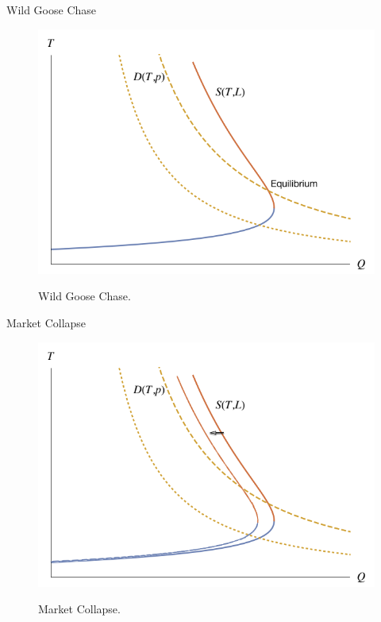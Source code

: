     \begin{frame}{Wild Goose Chase}
        \begin{figure}
            \centering
            {\includegraphics[scale=0.30]{plots/wild_goose_chase_1.png}}
            \caption{Wild Goose Chase.}
        \end{figure}
    \end{frame}


    \begin{frame}{Market Collapse}
        \begin{figure}
            \centering
            {\includegraphics[scale=0.30]{plots/market_collapse_0.png}}
            \caption{Market Collapse.}
        \end{figure}
    \end{frame}

